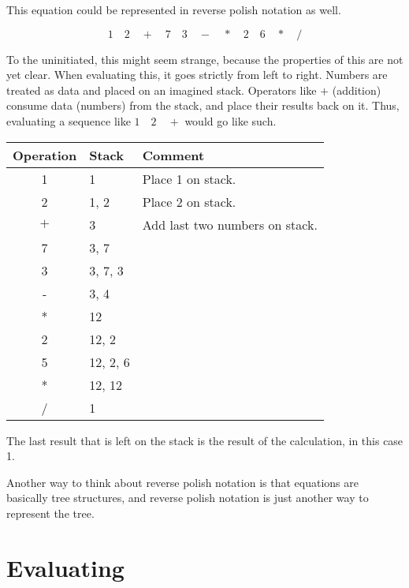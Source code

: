 \documentclass[a4paper,twocolumn]{article}
\begin{document}
This equation could be represented in reverse polish notation as well.

\begin{equation}
1\quad2\quad+\quad7\quad3\quad-\quad*\quad2\quad6\quad*\quad/  
\end{equation}

To the uninitiated, this might seem strange, because the properties of this are not yet clear. When evaluating this, it goes strictly from left to right. Numbers are treated as data and placed on an imagined stack. Operators like $+$ (addition) consume data (numbers) from the stack, and place their results back on it. Thus, evaluating a sequence like $1\quad2\quad+$ would go like such.

\begin{table}[h!]
\begin{tabular}{@{}clp{4cm}@{}}
\toprule
Operation & Stack & Comment\\
\midrule
1 & 1 & Place 1 on stack.\\
2 & 1, 2 & Place 2 on stack.\\
$+$ & 3 & Add last two numbers on stack.\\
7 & 3, 7\\
3 & 3, 7, 3\\
- & 3, 4\\
* & 12\\
2 & 12, 2\\
5 & 12, 2, 6\\
* & 12, 12\\
/ & 1\\
\bottomrule  
\end{tabular}
\end{table}

The last result that is left on the stack is the result of the calculation, in this case 1.

Another way to think about reverse polish notation is that equations are basically tree structures, and reverse polish notation is just another way to represent the tree.

\begin{center}
\end{center}

\section{Evaluating}
\end{document}
